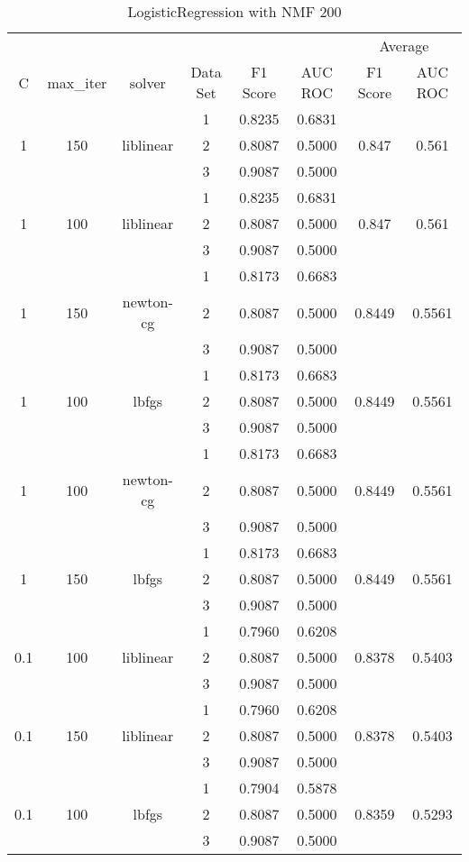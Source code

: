 \documentclass[12pt, twoside]{article}
\begin{document}
\begin{landscape}
\begin{table}[!htbp]
  \centering
  \begin{tabular}{cccccccc}
  \toprule
  {}	&	{}	&	{}	&	{}	&	{}	&	{}	&	\multicolumn{2}{c}{Average} \\
  \cmidrule(r){7-8}
  C	&	max\_iter	&	solver	&	Data Set	&	F1 Score	&	AUC ROC	&	F1 Score	&	AUC ROC \\
  \midrule
  	&	&	&	1	&	0.8235	&	0.6831	&		&	 \\
  1	&	150	&	liblinear	&	2	&	0.8087	&	0.5000	&	0.847	&	0.561 \\
  	&	&	&	3	&	0.9087	&	0.5000	&		&	 \\
  	\cmidrule(r){4-8}
  	&	&	&	1	&	0.8235	&	0.6831	&		&	 \\
 1	&	100	&	liblinear	&	2	&	0.8087	&	0.5000	&	0.847	&	0.561 \\
  	&	&	&	3	&	0.9087	&	0.5000	&		&	 \\
  	\cmidrule(r){4-8}
  	&	&	&	1	&	0.8173	&	0.6683	&		&	 \\
  1	&	150	&	newton-cg	&	2	&	0.8087	&	0.5000	&	0.8449	&	0.5561 \\
  	&	&	&	3	&	0.9087	&	0.5000	&		&	 \\
  	\cmidrule(r){4-8}
  	&	&	&	1	&	0.8173	&	0.6683	&		&	 \\
  1	&	100	&	lbfgs	&	2	&	0.8087	&	0.5000	&	0.8449	&	0.5561 \\
  	&	&	&	3	&	0.9087	&	0.5000	&		&	 \\
  	\cmidrule(r){4-8}
  	&	&	&	1	&	0.8173	&	0.6683	&		&	 \\
  1	&	100	&	newton-cg	&	2	&	0.8087	&	0.5000	&	0.8449	&	0.5561 \\
  	&	&	&	3	&	0.9087	&	0.5000	&		&	 \\
  	\cmidrule(r){4-8}
  	&	&	&	1	&	0.8173	&	0.6683	&		&	 \\
  1	&	150	&	lbfgs	&	2	&	0.8087	&	0.5000		&	0.8449	&	0.5561 \\
  	&	&	&	3	&	0.9087	&	0.5000		&		&	 \\
  	\cmidrule(r){4-8}
  	&	&	&	1	&	0.7960	&	0.6208	&		&	 \\
  0.1	&	100	&	liblinear	&	2	&	0.8087	&	0.5000	&	0.8378	&	0.5403 \\
  	&	&	&	3	&	0.9087	&	0.5000	&		&	 \\
  	\cmidrule(r){4-8}
  	&	&	&	1	&	0.7960	&	0.6208	&		&	 \\
  0.1	&	150	&	liblinear	&	2	&	0.8087	&	0.5000	&	0.8378	&	0.5403 \\
  	&	&	&	3	&	0.9087	&	0.5000	&		&	 \\
  	\cmidrule(r){4-8}
  	&	&	&	1	&	0.7904	&	0.5878	&		&	 \\
   0.1	&	100	&	lbfgs	&	2	&	0.8087	&	0.5000	&	0.8359	&	0.5293 \\
  	&	&	&	3	&	0.9087	&	0.5000	&		&	 \\
  \bottomrule
  \end{tabular}
  \caption{LogisticRegression with NMF 200}
\end{table}
\end{landscape}
\end{document}
